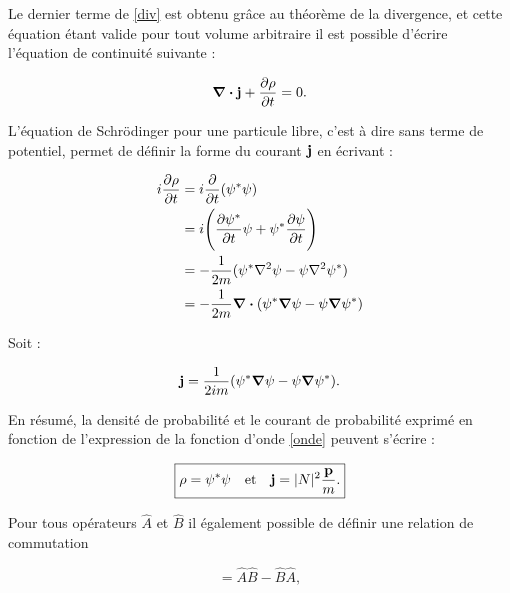         Le dernier terme de \ref{div} est obtenu grâce au théorème de la divergence, et cette équation étant valide pour tout volume arbitraire il est possible d'écrire l'équation de continuité suivante :

        \begin{equation}
            \grad\vdot\vb{j}+\pdv{\rho}{t}=0.
        \end{equation}

        L'équation de Schrödinger pour une particule libre, c'est à dire sans terme de potentiel, permet de définir la forme du courant $\vb{j}$ en écrivant :

        \begin{equation*}
        \begin{split}
        i\pdv{\rho}{t} & =i\pdv{t}(\large\psi^*\psi) \\
         & = i\Biggl(\pdv{\psi^*}{t}\psi + \psi^*\pdv{\psi}{t}\Biggr) \\
         & = -\frac{1}{2m}(\psi^*\laplacian\psi-\psi\laplacian\psi^*) \\
         & = -\frac{1}{2m}\grad\vdot(\psi^*\grad\psi-\psi\grad\psi^*) \\
        \end{split}
        \end{equation*}

        Soit :

        \begin{equation*}
            \vb{j} = \frac{1}{2im}(\psi^*\grad\psi-\psi\grad\psi^*). \\
        \end{equation*}

        En résumé, la densité de probabilité et le courant de probabilité exprimé en fonction de l'expression de la fonction d'onde \ref{onde} peuvent s'écrire :

        \begin{equation}
            \boxed{
            \rho=\psi^*\psi \quad \mbox{et} \quad \vb{j}=|N|^2\frac{\vb{p}}{m}.
            }
        \end{equation}
        
        Pour tous opérateurs $\hat{A}$ et $\hat{B}$ il également possible de définir une relation de commutation 
        
        \begin{equation}
            [\hat{A},\hat{B}]=\hat{A}\hat{B}-\hat{B}\hat{A},
        \end{equation}
        
